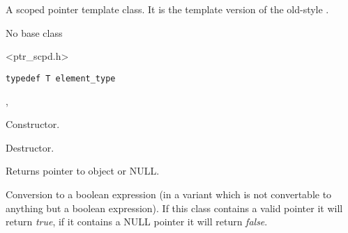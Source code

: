 \section{}\label{wxscopedptrtemplate}

A scoped pointer template class. It is the template version of
the old-style .


No base class


<ptr\_scpd.h>


{\small%
\begin{verbatim}
typedef T element_type
\end{verbatim}
}%


, 



\label{wxscopedptrtemplatewxscopedptrtemplate}


Constructor.

\label{wxscopedptrtemplatedtor}


Destructor.

\label{wxscopedptrtemplateget}


Returns pointer to object or NULL.

\label{wxscopedptrtemplateoperatorbool}


Conversion to a boolean expression (in a variant which is not 
convertable to anything but a boolean expression). If this class
contains a valid pointer it will return {\it true}, if it contains
a NULL pointer it will return {\it false}.

\label{wxscopedptrtemplateoperatorreft}

